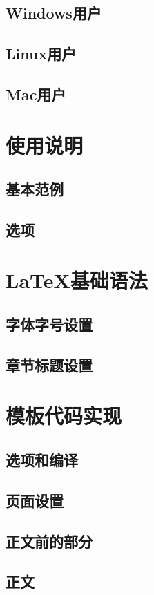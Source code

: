 \documentclass[doctor,openright]{buaathesis}
\begin{document}
	\section{Windows用户}
	\section{Linux用户}
	\section{Mac用户}
	
\chapter{使用说明}
	\section{基本范例}
	\section{选项}
\chapter{LaTeX{}基础语法}
	\section{字体字号设置}
	\section{章节标题设置}
	
\chapter{模板代码实现}
	\section{选项和编译}
	\section{页面设置}
	\newpage
	\section{正文前的部分}
	\section{正文}
\end{document}
